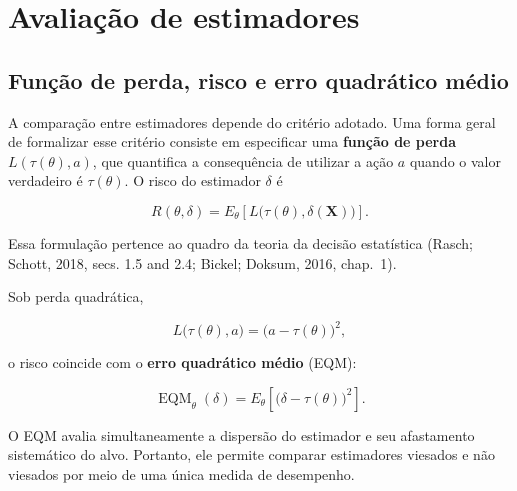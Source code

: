 \documentclass[
  letterpaper,
  DIV=11,
  numbers=noendperiod]{scrreprt}
\begin{document}
\section{Avaliação de estimadores}\label{avaliauxe7uxe3o-de-estimadores}

\subsection*{Função de perda, risco e erro quadrático
médio}\label{funuxe7uxe3o-de-perda-risco-e-erro-quadruxe1tico-muxe9dio}

A comparação entre estimadores depende do critério adotado. Uma forma
geral de formalizar esse critério consiste em especificar uma
\textbf{função de perda} \(L(\tau(\theta),a)\), que quantifica a
consequência de utilizar a ação \(a\) quando o valor verdadeiro é
\(\tau(\theta)\). O risco do estimador \(\delta\) é

\[R(\theta,\delta)
=
E_\theta\left[L\bigl(\tau(\theta),\delta(\mathbf{X})\bigr)\right].\]

Essa formulação pertence ao quadro da teoria da decisão estatística
(Rasch; Schott, 2018, secs. 1.5 and 2.4; Bickel; Doksum, 2016, chap.~1).

Sob perda quadrática,

\[L\bigl(\tau(\theta),a\bigr)
=
\bigl(a-\tau(\theta)\bigr)^2,\]

o risco coincide com o \textbf{erro quadrático médio} (EQM):

\[\operatorname{EQM}_\theta(\delta)
=
E_\theta\left[\bigl(\delta-\tau(\theta)\bigr)^2\right].\]

\begin{tcolorbox}[enhanced jigsaw, colback=white, leftrule=.75mm, colbacktitle=quarto-callout-note-color!10!white, breakable, titlerule=0mm, bottomtitle=1mm, title=\textcolor{quarto-callout-note-color}{\faInfo}\hspace{0.5em}{Interpretação}, colframe=quarto-callout-note-color-frame, toprule=.15mm, opacityback=0, bottomrule=.15mm, opacitybacktitle=0.6, arc=.35mm, toptitle=1mm, rightrule=.15mm, coltitle=black, left=2mm]

O EQM avalia simultaneamente a dispersão do estimador e seu afastamento
sistemático do alvo. Portanto, ele permite comparar estimadores viesados
e não viesados por meio de uma única medida de desempenho.

\end{tcolorbox}
\end{document}
